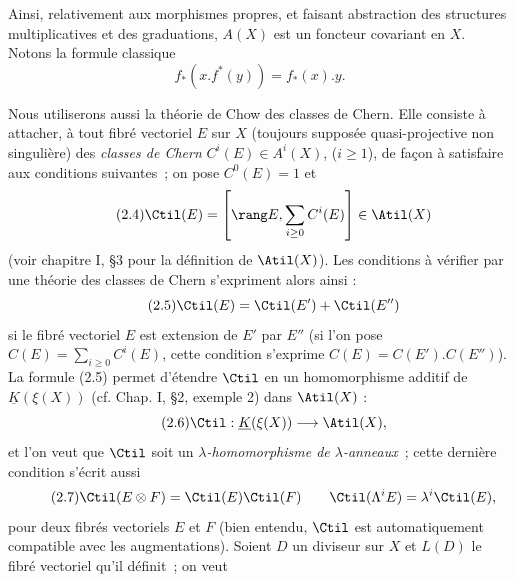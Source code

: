 Ainsi, relativement aux morphismes propres, et faisant abstraction des structures multiplicatives et des graduations, $A(X)$ est un foncteur covariant en $X$. Notons la formule classique
\begin{equation}\tag{2.3}
 f_*(x.f^*(y))=f_*(x).y .
\end{equation}

Nous utiliserons aussi la théorie de Chow des classes de Chern. Elle consiste à attacher, à tout fibré vectoriel $E$ sur $X$ (toujours supposée quasi-projective non singulière) des \emph{classes de Chern} $C^i(E)\in A^i(X)$, ($i\geq 1$), de façon à satisfaire aux conditions suivantes~; on pose $C^0(E)=1$ et
\begin{equation}\tag{2.4}
 \Ctil(E)=\left[\rang E,\sum_{i\geq 0}C^i(E)\right]\in \Atil(X)
\end{equation}
(voir chapitre I, \S 3 pour la définition de $\Atil(X)$). Les conditions à vérifier par une théorie des classes de Chern s'expriment alors ainsi :
\begin{equation}\tag{2.5}
 \Ctil(E)=\Ctil(E')+\Ctil(E'')
\end{equation}
si le fibré vectoriel $E$ est extension de $E'$ par $E''$ (si l'on pose $C(E)=\sum_{i\geq0}C^i(E)$, cette condition s'exprime $C(E)=C(E').C(E'')$). La formule (2.5) permet d'étendre $\Ctil$ en un homomorphisme additif de $\underline{K}(\xi(X))$ (cf. Chap. I, \S 2, exemple 2) dans $\Atil(X)$ :
\begin{equation}\tag{2.6}
 \Ctil:\underline{K}(\xi(X))\longrightarrow \Atil(X),
\end{equation}
et l'on veut que $\Ctil$ soit un \emph{$\lambda$-homomorphisme de $\lambda$-anneaux}~; cette dernière condition s'écrit aussi
\begin{equation}\tag{2.7}
 \Ctil(E\otimes F)=\Ctil(E)\Ctil(F)\qquad
 \Ctil(\Lambda^iE)=\lambda^i\Ctil(E),
\end{equation}
pour deux fibrés vectoriels $E$ et $F$ (bien entendu, $\Ctil$ est automatiquement compatible avec les augmentations). Soient $D$ un diviseur sur $X$ et $L(D)$ le fibré vectoriel qu'il définit~; on veut
